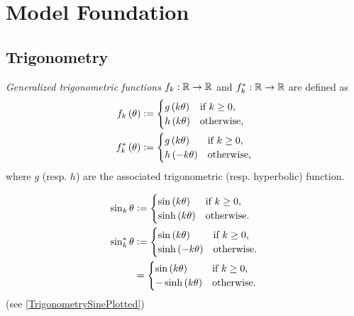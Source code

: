 \documentclass[stu, babel, american, biblatex, a4paper, leqno, draftall]{apa7}
\begin{document}
\section{Model Foundation}
\subsection{Trigonometry}
\begin{definition}\label{M:Trigonometry}
    \textit{Generalized trigonometric functions} $f_k:\mathbb{R}\to\mathbb{R}$ and $f_k^\ast:\mathbb{R}\to\mathbb{R}$ are defined as
    \begin{align*}
        f_k\left(\theta\right) & \vcentcolon=
        \begin{cases}
            g\left(k\theta\right) & \text{if $k\geq0$,} \\
            h\left(k\theta\right) & \text{otherwise,}   \\
        \end{cases} \\
        f_k^\ast\left(\theta\right) & \vcentcolon=
        \begin{cases}
            g\left(k\theta\right) & \text{if $k\geq0$,} \\
            h\left(-k\theta\right) & \text{otherwise,}   \\
        \end{cases}
    \end{align*}
    where $g$ (resp. $h$) are the associated trigonometric (resp. hyperbolic) function.
\end{definition}
\begin{example}\label{M:Trigonometry:Sine}
    \begin{align*}
        \sin_k{\theta} & \vcentcolon=
        \begin{cases}
            \sin\left(k\theta\right)  & \text{if $k\geq0$,} \\
            \sinh\left(k\theta\right) & \text{otherwise.}   \\
        \end{cases} \\
        \sin_k^\ast{\theta} & \vcentcolon=
        \begin{cases}
            \sin\left(k\theta\right)  & \text{if $k\geq0$,} \\
            \sinh\left(-k\theta\right) & \text{otherwise.}   \\
        \end{cases} \\
        & =
        \begin{cases}
            \sin\left(k\theta\right)  & \text{if $k\geq0$,} \\
            -\sinh\left(k\theta\right) & \text{otherwise.}   \\
        \end{cases}
    \end{align*}
    (see \cref{TrigonometrySinePlotted})
\end{example}
\end{document}
